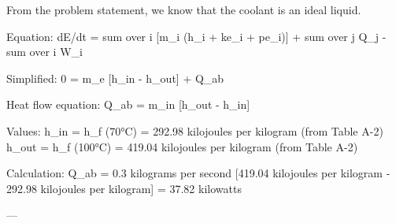 From the problem statement, we know that the coolant is an ideal liquid.  

Equation:  
dE/dt = sum over i [m_i (h_i + ke_i + pe_i)] + sum over j Q_j - sum over i W_i  

Simplified:  
0 = m_e [h_in - h_out] + Q_ab  

Heat flow equation:  
Q_ab = m_in [h_out - h_in]  

Values:  
h_in = h_f (70°C) = 292.98 kilojoules per kilogram (from Table A-2)  
h_out = h_f (100°C) = 419.04 kilojoules per kilogram (from Table A-2)  

Calculation:  
Q_ab = 0.3 kilograms per second [419.04 kilojoules per kilogram - 292.98 kilojoules per kilogram] = 37.82 kilowatts  

---